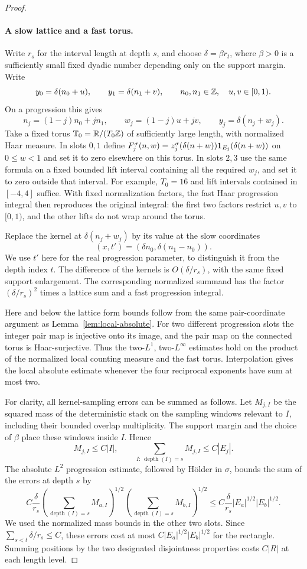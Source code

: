 \begin{proof}
\paragraph{A slow lattice and a fast torus.}
Write $r_s$ for the interval length at depth $s$, and choose
$\delta=\beta r_t$, where $\beta>0$ is a sufficiently small fixed
dyadic number depending only on the support margin.  Write
\[
 y_0=\delta(n_0+u),\qquad y_1=\delta(n_1+v),
 \qquad n_0,n_1\in\mathbb Z,\quad u,v\in[0,1).
\]
On a progression this gives
\[
 n_j=(1-j)n_0+jn_1,
 \qquad w_j=(1-j)u+jv,
 \qquad y_j=\delta(n_j+w_j).
\]
Take a fixed torus $\mathbb T_0=\mathbb R/(T_0\mathbb Z)$ of sufficiently large length,
with normalized Haar measure.  In slots $0,1$ define
$F_j^\sigma(n,w)=z_j^\sigma(\delta(n+w))\mathbf 1_{E_j}(\delta(n+w))$
on $0\le w<1$ and set it to zero elsewhere on this torus.  In slots
$2,3$ use the same formula on a fixed bounded lift interval containing
all the required $w_j$, and set it to zero outside that interval.
For example, $T_0=16$ and lift intervals contained in $[-4,4]$ suffice.
With fixed normalization factors, the fast Haar progression integral
then reproduces the original integral: the first two factors restrict
$u,v$ to $[0,1)$, and the other lifts do not wrap around the torus.

Replace the kernel at $\delta(n_j+w_j)$ by its value at the slow
coordinates
\[
 (x,t')=(\delta n_0,\delta(n_1-n_0)).
\]
We use $t'$ here for the real progression parameter, to distinguish it
from the depth index $t$.  The difference of the kernels is
$O(\delta/r_s)$, with the same fixed support enlargement.  The
corresponding normalized summand has the factor $(\delta/r_s)^2$
times a lattice sum and a fast progression integral.

Here and below the lattice form bounds follow from the same
pair-coordinate argument as Lemma~\ref{lem:local-absolute}.  For two
different progression slots the integer pair map is injective onto
its image, and the pair map on the connected torus is Haar-surjective.
Thus the two-$L^1$, two-$L^\infty$ estimates hold on the product of
the normalized local counting measure and the fast torus.  Interpolation
gives the local absolute estimate whenever the four reciprocal
exponents have sum at most two.

For clarity, all kernel-sampling errors can be summed as follows.
Let $M_{j,I}$ be the squared mass of the deterministic stack on the
sampling windows relevant to $I$, including their bounded overlap
multiplicity.  The support margin and the choice of $\beta$ place
these windows inside $I$.  Hence
\[
 M_{j,I}\le C|I|,\qquad
 \sum_{I:\,\operatorname{depth}(I)=s} M_{j,I}\le C|E_j|.
\]
The absolute $L^2$ progression estimate, followed by H\"older in
$\sigma$, bounds the sum of the errors at depth $s$ by
\[
 C\frac{\delta}{r_s}
 \left(\sum_{\operatorname{depth}(I)=s}M_{a,I}\right)^{1/2}
 \left(\sum_{\operatorname{depth}(I)=s}M_{b,I}\right)^{1/2}
 \le C\frac{\delta}{r_s}|E_a|^{1/2}|E_b|^{1/2}.
\]
We used the normalized mass bounds in the other two slots.  Since
$\sum_{s<t}\delta/r_s\le C$, these errors cost at most
$C|E_a|^{1/2}|E_b|^{1/2}$ for the rectangle.  Summing positions by
the two designated disjointness properties costs $C|R|$ at each
length level.


\end{proof}
